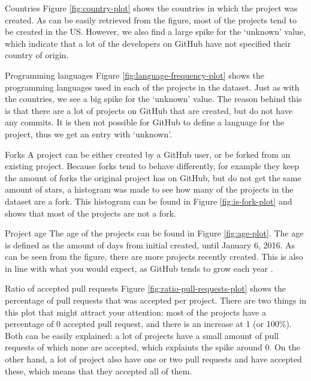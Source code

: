     	\begin{LaTeXdescription}
    	\item[Countries]
    	Figure \ref{fig:country-plot} shows the countries in which the project was created.
    	As can be easily retrieved from the figure, most of the projects tend to be created in the US.
    	However, we also find a large spike for the `unknown' value, which indicate that a lot of the developers on GitHub have not specified their country of origin.
    	\item[Programming languages]
    	Figure \ref{fig:language-frequency-plot} shows the programming languages used in each of the projects in the dataset.
    	Just as with the countries, we see a big spike for the `unknown' value.
    	The reason behind this is that there are a lot of projects on GitHub that are created, but do not have any commits.
    	It is then not possible for GitHub to define a language for the project, thus we get an entry with `unknown'.
    	\item[Forks]
    	A project can be either created by a GitHub user, or be forked from an existing project.
    	Because forks tend to behave differently, for example they keep the amount of forks the original project has on GitHub, but do not get the same amount of stars, a histogram was made to see how many of the projects in the dataset are a fork.
    	This histogram can be found in Figure \ref{fig:is-fork-plot} and shows that most of the projects are not a fork.
    	\item[Project age]
    	The age of the projects can be found in Figure \ref{fig:age-plot}.
    	The age is defined as the amount of days from initial created, until January 6, 2016.
    	As can be seen from the figure, there are more projects recently created.
    	This is also in line with what you would expect, as GitHub tends to grow each year \cite{github-2013}.
    	\item[Ratio of accepted pull requests]
    	Figure \ref{fig:ratio-pull-requests-plot} shows the percentage of pull requests that was accepted per project.
    	There are two things in this plot that might attract your attention: most of the projects have a percentage of 0 accepted pull request, and there is an increase at 1 (or 100\%). 
    	Both can be easily explained: a lot of projects have a small amount of pull requests of which none are accepted, which explaints the spike around 0.
    	On the other hand, a lot of project also have one or two pull requests and have accepted these, which means that they accepted all of them.

\end{LaTeXdescription}
